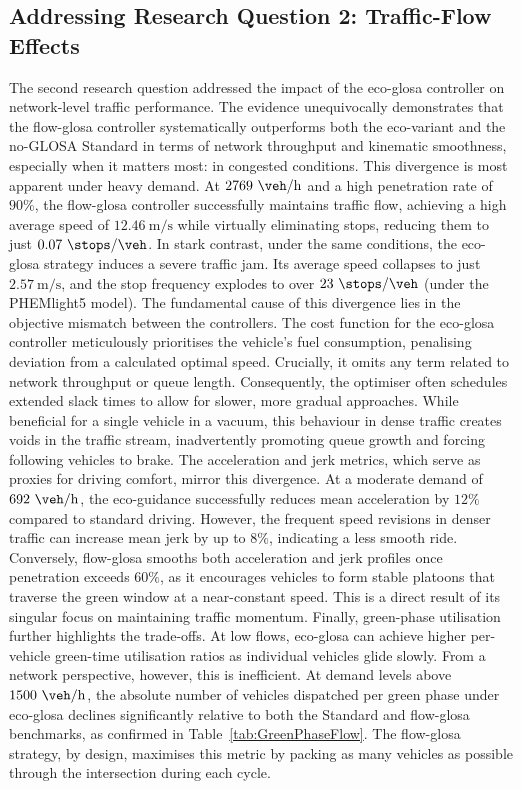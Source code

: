 \subsection*{Addressing Research Question 2: Traffic-Flow Effects}
The second research question addressed the impact of the \ac{eco-glosa} controller on network-level traffic performance. The evidence unequivocally demonstrates that the \ac{flow-glosa} controller systematically outperforms both the eco-variant and the no-GLOSA Standard in terms of network throughput and kinematic smoothness, especially when it matters most: in congested conditions.
\mynewline
This divergence is most apparent under heavy demand. At $2769~\unit{\veh\per\hour}$ and a high penetration rate of $90\%$, the \ac{flow-glosa} controller successfully maintains traffic flow, achieving a high average speed of $12.46~\unit{\metre\per\second}$ while virtually eliminating stops, reducing them to just $0.07~\unit{\stops\per\veh}$. In stark contrast, under the same conditions, the \ac{eco-glosa} strategy induces a severe traffic jam. Its average speed collapses to just $2.57~\unit{\metre\per\second}$, and the stop frequency explodes to over $23~\unit{\stops\per\veh}$ (under the PHEMlight5 model).
\mynewline
The fundamental cause of this divergence lies in the objective mismatch between the controllers. The cost function for the \ac{eco-glosa} controller meticulously prioritises the vehicle's fuel consumption, penalising deviation from a calculated optimal speed. Crucially, it omits any term related to network throughput or queue length. Consequently, the optimiser often schedules extended slack times to allow for slower, more gradual approaches. While beneficial for a single vehicle in a vacuum, this behaviour in dense traffic creates voids in the traffic stream, inadvertently promoting queue growth and forcing following vehicles to brake.
\mynewline
The acceleration and jerk metrics, which serve as proxies for driving comfort, mirror this divergence. At a moderate demand of $692~\unit{\veh\per\hour}$, the eco-guidance successfully reduces mean acceleration by $12\%$ compared to standard driving. However, the frequent speed revisions in denser traffic can increase mean jerk by up to $8\%$, indicating a less smooth ride. Conversely, \ac{flow-glosa} smooths both acceleration and jerk profiles once penetration exceeds $60\%$, as it encourages vehicles to form stable platoons that traverse the green window at a near-constant speed. This is a direct result of its singular focus on maintaining traffic momentum.
\mynewline
Finally, green-phase utilisation further highlights the trade-offs. At low flows, \ac{eco-glosa} can achieve higher per-vehicle green-time utilisation ratios as individual vehicles glide slowly. From a network perspective, however, this is inefficient. At demand levels above $1500~\unit{\veh\per\hour}$, the absolute number of vehicles dispatched per green phase under \ac{eco-glosa} declines significantly relative to both the Standard and \ac{flow-glosa} benchmarks, as confirmed in Table~\vref{tab:GreenPhaseFlow}. The \ac{flow-glosa} strategy, by design, maximises this metric by packing as many vehicles as possible through the intersection during each cycle.

